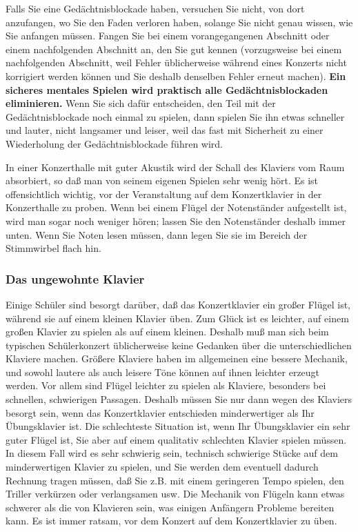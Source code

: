 Falls Sie eine Gedächtnisblockade haben, versuchen Sie nicht, von dort anzufangen, wo Sie den Faden verloren haben, solange Sie nicht genau wissen, wie Sie anfangen müssen.
Fangen Sie bei einem vorangegangenen Abschnitt oder einem nachfolgenden Abschnitt an, den Sie gut kennen (vorzugsweise bei einem nachfolgenden Abschnitt, weil Fehler üblicherweise während eines Konzerts nicht korrigiert werden können und Sie deshalb denselben Fehler erneut machen).
\textbf{Ein sicheres mentales Spielen wird praktisch alle Gedächtnisblockaden eliminieren.}
Wenn Sie sich dafür entscheiden, den Teil mit der Gedächtnisblockade noch einmal zu spielen, dann spielen Sie ihn etwas schneller und lauter, nicht langsamer und leiser, weil das fast mit Sicherheit zu einer Wiederholung der Gedächtnisblockade führen wird.

In einer Konzerthalle mit guter Akustik wird der Schall des Klaviers vom Raum absorbiert, so daß man von seinem eigenen Spielen sehr wenig hört.
Es ist offensichtlich wichtig, vor der Veranstaltung auf dem Konzertklavier in der Konzerthalle zu proben.
Wenn bei einem Flügel der Notenständer aufgestellt ist, wird man sogar noch weniger hören; lassen Sie den Notenständer deshalb immer unten.
Wenn Sie Noten lesen müssen, dann legen Sie sie im Bereich der Stimmwirbel flach hin.


\subsubsection{Das ungewohnte Klavier}
\label{c1iii14h} 

Einige Schüler sind besorgt darüber, daß das Konzertklavier ein großer Flügel ist, während sie auf einem kleinen Klavier üben.
Zum Glück ist es leichter, auf einem großen Klavier zu spielen als auf einem kleinen.
Deshalb muß man sich beim typischen Schülerkonzert üblicherweise keine Gedanken über die unterschiedlichen Klaviere machen.
Größere Klaviere haben im allgemeinen eine bessere Mechanik, und sowohl lautere als auch leisere Töne können auf ihnen leichter erzeugt werden.
Vor allem sind Flügel leichter zu spielen als Klaviere, besonders bei schnellen, schwierigen Passagen.
Deshalb müssen Sie nur dann wegen des Klaviers besorgt sein, wenn das Konzertklavier entschieden minderwertiger als Ihr Übungsklavier ist.
Die schlechteste Situation ist, wenn Ihr Übungsklavier ein sehr guter Flügel ist, Sie aber auf einem qualitativ schlechten Klavier spielen müssen.
In diesem Fall wird es sehr schwierig sein, technisch schwierige Stücke auf dem minderwertigen Klavier zu spielen, und Sie werden dem eventuell dadurch Rechnung tragen müssen, daß Sie z.B. mit einem geringeren Tempo spielen, den Triller verkürzen oder verlangsamen usw.
Die Mechanik von Flügeln kann etwas schwerer als die von Klavieren sein, was einigen Anfängern Probleme bereiten kann.
Es ist immer ratsam, vor dem Konzert auf dem Konzertklavier zu üben.


